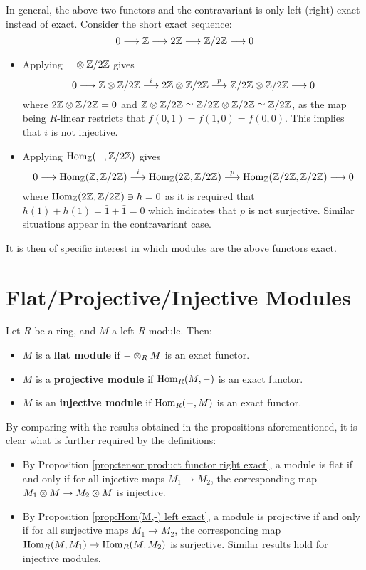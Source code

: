 \documentclass{article}
\begin{document}
In general, the above two functors and the contravariant is only left (right) exact instead of exact. Consider the short exact sequence:
\[
    0 \longrightarrow \mathbb{Z} \longrightarrow 2\mathbb{Z} \longrightarrow \mathbb{Z}/2\mathbb{Z} \longrightarrow 0
\]
\begin{itemize}
    \item Applying $- \otimes \mathbb{Z}/2\mathbb{Z}$ gives
    \[
        0 \longrightarrow \mathbb{Z} \otimes \mathbb{Z}/2\mathbb{Z} \overset{i}{\longrightarrow} 2\mathbb{Z} \otimes \mathbb{Z}/2\mathbb{Z} \overset{p}{\longrightarrow} \mathbb{Z}/2\mathbb{Z} \otimes \mathbb{Z}/2\mathbb{Z} \longrightarrow 0
    \]
    where $2\mathbb{Z} \otimes \mathbb{Z}/2\mathbb{Z} = 0$ and $\mathbb{Z} \otimes \mathbb{Z}/2\mathbb{Z} \simeq \mathbb{Z}/2\mathbb{Z} \otimes \mathbb{Z}/2\mathbb{Z} \simeq \mathbb{Z}/2\mathbb{Z}$, as the map being $R$-linear restricts that $f(0, 1) = f(1, 0) = f(0, 0)$. This implies that $i$ is not injective.
    \item Applying $\mathrm{Hom}_{\mathbb{Z}}(-, \mathbb{Z}/2\mathbb{Z})$ gives
    \[
        0 \longrightarrow \mathrm{Hom}_{\mathbb{Z}}(\mathbb{Z}, \mathbb{Z}/2\mathbb{Z}) \overset{i}{\longrightarrow} \mathrm{Hom}_{\mathbb{Z}}(2\mathbb{Z}, \mathbb{Z}/2\mathbb{Z}) \overset{p}{\longrightarrow} \mathrm{Hom}_{\mathbb{Z}}(\mathbb{Z}/2\mathbb{Z}, \mathbb{Z}/2\mathbb{Z}) \longrightarrow 0
    \]
    where $\mathrm{Hom}_{\mathbb{Z}}(2\mathbb{Z}, \mathbb{Z}/2\mathbb{Z}) \ni h = 0$ as it is required that $h(1) + h(1) = \bar{1} + \bar{1} = 0$ which indicates that $p$ is not surjective. Similar situations appear in the contravariant case.
\end{itemize}

It is then of specific interest in which modules are the above functors exact.

\section{Flat/Projective/Injective Modules}

\begin{definition}
    Let $R$ be a ring, and $M$ a left $R$-module. Then:
    \begin{itemize}
        \item $M$ is a \textbf{flat module} if $- \otimes_R M$ is an exact functor.
        \item $M$ is a \textbf{projective module} if $\mathrm{Hom}_R(M, -)$ is an exact functor.
        \item $M$ is an \textbf{injective module} if $\mathrm{Hom}_R(-, M)$ is an exact functor.
    \end{itemize}
\end{definition}

\begin{remark}\label{rmk:diff def for projective module}
    By comparing with the results obtained in the propositions aforementioned, it is clear what is further required by the definitions:
    \begin{itemize}
        \item By Proposition \ref{prop:tensor product functor right exact}, a module is flat if and only if for all injective maps $M_1 \to M_2$, the corresponding map \\ $M_1 \otimes M \to M_2 \otimes M$ is injective.
        \item By Proposition \ref{prop:Hom(M,-) left exact}, a module is projective if and only if for all surjective maps $M_1 \to M_2$, the corresponding map \\ $\mathrm{Hom}_R(M, M_1) \to \mathrm{Hom}_R(M, M_2)$ is surjective. Similar results hold for injective modules. 
    \end{itemize}
\end{remark}
\end{document}
